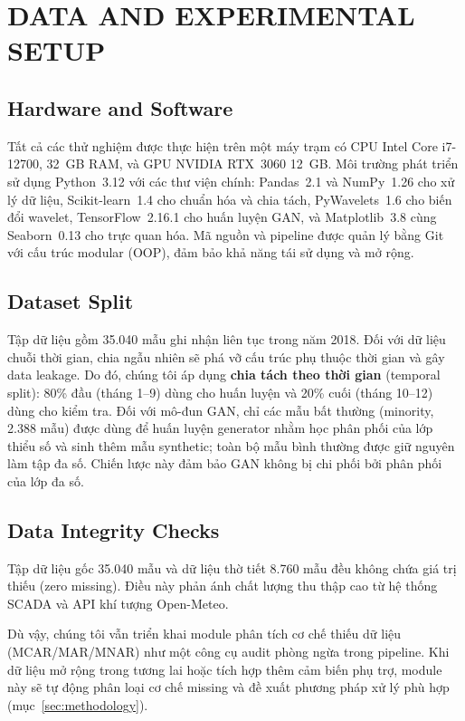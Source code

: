 \section{DATA AND EXPERIMENTAL SETUP}
\label{sec:experimental}

\subsection{Hardware and Software}

Tất cả các thử nghiệm được thực hiện trên một máy trạm có CPU Intel Core i7-12700, 32~GB RAM, và GPU NVIDIA RTX~3060 12~GB.
Môi trường phát triển sử dụng Python~3.12 với các thư viện chính:
Pandas~2.1 và NumPy~1.26 cho xử lý dữ liệu,
Scikit-learn~1.4 cho chuẩn hóa và chia tách,
PyWavelets~1.6 cho biến đổi wavelet,
TensorFlow~2.16.1 cho huấn luyện GAN,
và Matplotlib~3.8 cùng Seaborn~0.13 cho trực quan hóa.
Mã nguồn và pipeline được quản lý bằng Git với cấu trúc modular (OOP),
đảm bảo khả năng tái sử dụng và mở rộng.

\subsection{Dataset Split}

Tập dữ liệu gồm 35.040 mẫu ghi nhận liên tục trong năm 2018.
Đối với dữ liệu chuỗi thời gian, chia ngẫu nhiên sẽ phá vỡ cấu trúc phụ thuộc thời gian và gây data leakage.
Do đó, chúng tôi áp dụng \textbf{chia tách theo thời gian} (temporal split):
80\% đầu (tháng 1--9) dùng cho huấn luyện và 20\% cuối (tháng 10--12) dùng cho kiểm tra.
Đối với mô-đun GAN, chỉ các mẫu bất thường (minority, 2.388 mẫu) được dùng để huấn luyện generator
nhằm học phân phối của lớp thiểu số và sinh thêm mẫu synthetic;
toàn bộ mẫu bình thường được giữ nguyên làm tập đa số.
Chiến lược này đảm bảo GAN không bị chi phối bởi phân phối của lớp đa số.

\subsection{Data Integrity Checks}

Tập dữ liệu gốc 35.040 mẫu và dữ liệu thờ tiết 8.760 mẫu đều không chứa giá trị thiếu (zero missing).
Điều này phản ánh chất lượng thu thập cao từ hệ thống SCADA và API khí tượng Open-Meteo.

Dù vậy, chúng tôi vẫn triển khai module phân tích cơ chế thiếu dữ liệu (MCAR/MAR/MNAR)
như một công cụ audit phòng ngừa trong pipeline.
Khi dữ liệu mở rộng trong tương lai hoặc tích hợp thêm cảm biến phụ trợ,
module này sẽ tự động phân loại cơ chế missing và đề xuất phương pháp xử lý phù hợp
(mục~\ref{sec:methodology}).

